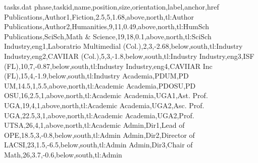\documentclass{article}
\begin{document}
\usetikzlibrary{shadows}
\usetikzlibrary{positioning}

\begin{filecontents*}{tasks.dat}
phase,taskid,name,position,size,orientation,label,anchor,href
Publications,Author1,Fiction,2.5,5,1.68,above,north,tl:Author
Publications,Author2,Humanities,9,11,0.49,above,north,tl:HumSch
Publications,SciSch,Math \& Science,19,18,0.1,above,north,tl:SciSch
Industry,eng1,Laboratrio Multimedial (Col.),2,3,-2.68,below,south,tl:Industry
Industry,eng2,CAVIIAR (Col.),5,3,-1.8,below,south,tl:Industry
Industry,eng3,ISF (FL),10,7,-0.87,below,south,tl:Industry
Industry,eng4,CAVIIAR Inc (FL),15,4,-1.9,below,south,tl:Industry
Academia,PDUM,PD UM,14.5,1,5.5,above,north,tl:Academic
Academia,PDOSU,PD OSU,16,2.5,1,above,north,tl:Academic
Academia,UGA1,Ast. Prof. UGA,19,4,1,above,north,tl:Academic
Academia,UGA2,Asc. Prof. UGA,22.5,3,1,above,north,tl:Academic
Academia,UGA2,Prof. UTSA,26,4,1,above,north,tl:Academic
Admin,Dir1,Lead of OPE,18.5,3,-0.8,below,south,tl:Admin
Admin,Dir2,Director of LACSI,23,1.5,-6.5,below,south,tl:Admin
Admin,Dir3,Chair of Math,26,3.7,-0.6,below,south,tl:Admin
\end{filecontents*}
\end{document}
